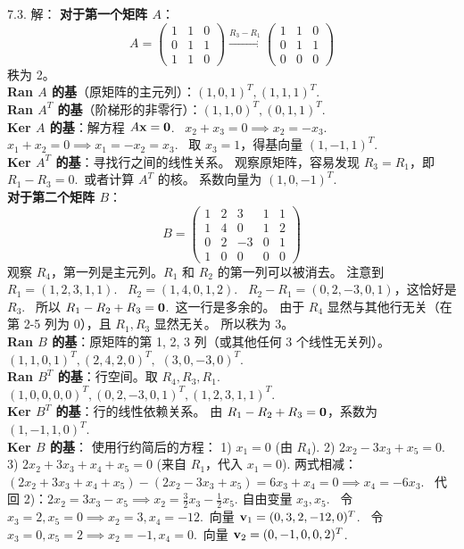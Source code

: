 \begin{exer}
7.3. 解：
\textbf{对于第一个矩阵 $A$}：
$$ A = \begin{pmatrix} 1 & 1 & 0 \\ 0 & 1 & 1 \\ 1 & 1 & 0 \end{pmatrix} \xrightarrow{R_3 - R_1} \begin{pmatrix} 1 & 1 & 0 \\ 0 & 1 & 1 \\ 0 & 0 & 0 \end{pmatrix} $$
秩为 2。\\
\textbf{Ran $A$ 的基}（原矩阵的主元列）：$(1, 0, 1)^T, (1, 1, 1)^T$.~\\
\textbf{Ran $A^T$ 的基}（阶梯形的非零行）：$(1, 1, 0)^T, (0, 1, 1)^T$.~\\
\textbf{Ker $A$ 的基}：解方程 $A\mathbf{x} = \mathbf{0}$.~
$x_2 + x_3 = 0 \implies x_2 = -x_3$.~
$x_1 + x_2 = 0 \implies x_1 = -x_2 = x_3$.~
取 $x_3 = 1$，得基向量 $(1, -1, 1)^T$.~\\
\textbf{Ker $A^T$ 的基}：寻找行之间的线性关系。
观察原矩阵，容易发现 $R_3 = R_1$，即 $R_1 - R_3 = 0$.~或者计算 $A^T$ 的核。
系数向量为 $(1, 0, -1)^T$.~
\\
\textbf{对于第二个矩阵 $B$}：
$$ B = \begin{pmatrix} 1 & 2 & 3 & 1 & 1 \\ 1 & 4 & 0 & 1 & 2 \\ 0 & 2 & -3 & 0 & 1 \\ 1 & 0 & 0 & 0 & 0 \end{pmatrix} $$
观察 $R_4$，第一列是主元列。$R_1$ 和 $R_2$ 的第一列可以被消去。
注意到 $R_1 = (1, 2, 3, 1, 1)$.~
$R_2 = (1, 4, 0, 1, 2)$.~
$R_2 - R_1 = (0, 2, -3, 0, 1)$，这恰好是 $R_3$.~
所以 $R_1 - R_2 + R_3 = \mathbf{0}$.~这一行是多余的。
由于 $R_4$ 显然与其他行无关（在第 2-5 列为 0），且 $R_1, R_3$ 显然无关。
所以秩为 3。\\
\textbf{Ran $B$ 的基}：原矩阵的第 1, 2, 3 列（或其他任何 3 个线性无关列）。
$(1,1,0,1)^T, (2,4,2,0)^T, $ $(3,0,-3,0)^T$.~\\
\textbf{Ran $B^T$ 的基}：行空间。取 $R_4, R_3, R_1$.~
$(1,0,0,0,0)^T, (0,2,-3,0,1)^T, (1,2,3,1,1)^T$.~\\
\textbf{Ker $B^T$ 的基}：行的线性依赖关系。
由 $R_1 - R_2 + R_3 = \mathbf{0}$，系数为 $(1, -1, 1, 0)^T$.~\\
\textbf{Ker $B$ 的基}：
使用行约简后的方程：
1) $x_1 = 0$ (由 $R_4$).
2) $2x_2 - 3x_3 + x_5 = 0$.
3) $2x_2 + 3x_3 + x_4 + x_5 = 0$ (来自 $R_1$，代入 $x_1=0$).
两式相减：$(2x_2 + 3x_3 + x_4 + x_5) - (2x_2 - 3x_3 + x_5) = 6x_3 + x_4 = 0 \implies x_4 = -6x_3$.~
代回 2)：$2x_2 = 3x_3 - x_5 \implies x_2 = \frac{3}{2}x_3 - \frac{1}{2}x_5$.
自由变量 $x_3, x_5$.~
令 $x_3=2, x_5=0 \implies x_2=3, x_4=-12$.~向量 $\mathbf{v}_1 = (0, 3, 2, -12, 0)^T$.~
令 $x_3=0, x_5=2 \implies x_2=-1, x_4=0$.~向量 $\mathbf{v}_2 = (0, -1, 0, 0, 2)^T$.~


\end{exer}
